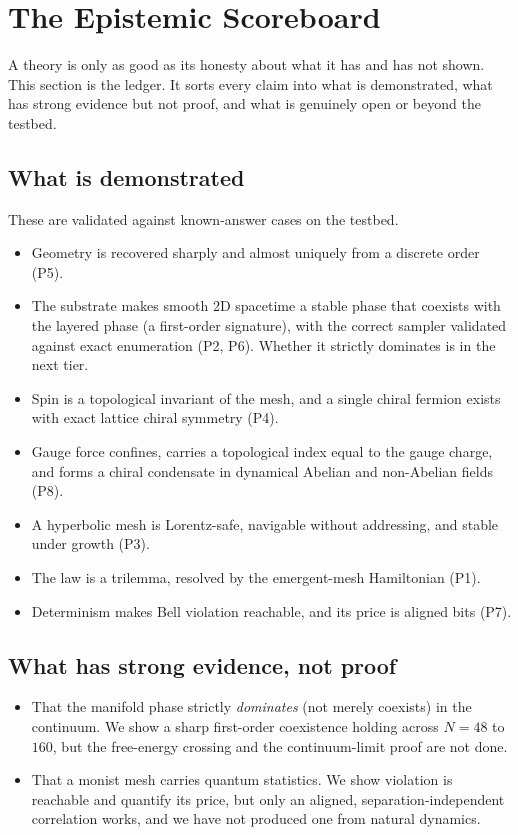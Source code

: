 \section{The Epistemic Scoreboard}
\label{sec:scoreboard}

A theory is only as good as its honesty about what it has and has not shown. This section is the ledger. It sorts every claim into what is demonstrated, what has strong evidence but not proof, and what is genuinely open or beyond the testbed.

\subsection{What is demonstrated}

These are validated against known-answer cases on the testbed.

\begin{itemize}
\item Geometry is recovered sharply and almost uniquely from a discrete order (P5).
\item The substrate makes smooth 2D spacetime a stable phase that coexists with the layered phase (a first-order signature), with the correct sampler validated against exact enumeration (P2, P6). Whether it strictly dominates is in the next tier.
\item Spin is a topological invariant of the mesh, and a single chiral fermion exists with exact lattice chiral symmetry (P4).
\item Gauge force confines, carries a topological index equal to the gauge charge, and forms a chiral condensate in dynamical Abelian and non-Abelian fields (P8).
\item A hyperbolic mesh is Lorentz-safe, navigable without addressing, and stable under growth (P3).
\item The law is a trilemma, resolved by the emergent-mesh Hamiltonian (P1).
\item Determinism makes Bell violation reachable, and its price is aligned bits (P7).
\end{itemize}

\subsection{What has strong evidence, not proof}

\begin{itemize}
\item That the manifold phase strictly \emph{dominates} (not merely coexists) in the continuum. We show a sharp first-order coexistence holding across $N = 48$ to $160$, but the free-energy crossing and the continuum-limit proof are not done.
\item That a monist mesh carries quantum statistics. We show violation is reachable and quantify its price, but only an aligned, separation-independent correlation works, and we have not produced one from natural dynamics.
\end{itemize}

